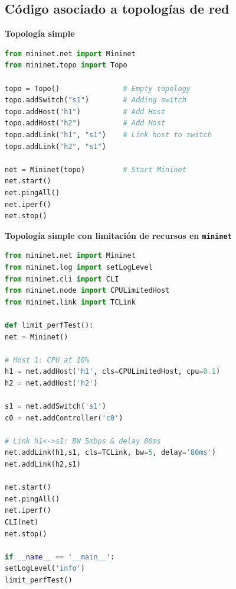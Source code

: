 \documentclass[12pt]{article}
\begin{document}
	\pagebreak
	
	\subsection{Código asociado a topologías de red}
	\label{sec: anexo 4}
	
	\vspace{10px}
	\noindent \textbf{\large Topología simple}\\
	
	\begin{lstlisting}[language=Python, caption={Implementación topología simple utilizando \texttt{mininet} (\texttt{basic.py})}, label={lst: topo simple}]
from mininet.net import Mininet
from mininet.topo import Topo

topo = Topo()				# Empty topology
topo.addSwitch("s1")		# Adding switch
topo.addHost("h1")			# Add Host
topo.addHost("h2")			# Add Host
topo.addLink("h1", "s1")	# Link host to switch
topo.addLink("h2", "s1")

net = Mininet(topo)			# Start Mininet
net.start()
net.pingAll()
net.iperf()
net.stop()
	\end{lstlisting}

	\vspace{20px}
	\noindent \textbf{\large Topología simple con limitación de recursos en \texttt{mininet}}\\
	\begin{lstlisting}[language=Python, caption={Código topología simple con limitación de recursos en \texttt{mininet} (\texttt{limit.py})}, label={lst: topo simple cpu mn}]
from mininet.net import Mininet
from mininet.log import setLogLevel
from mininet.cli import CLI
from mininet.node import CPULimitedHost
from mininet.link import TCLink

def limit_perfTest():
net = Mininet()

# Host 1: CPU at 10%
h1 = net.addHost('h1', cls=CPULimitedHost, cpu=0.1)		
h2 = net.addHost('h2')

s1 = net.addSwitch('s1')
c0 = net.addController('c0')

# Link h1<->s1: BW 5mbps & delay 80ms
net.addLink(h1,s1, cls=TCLink, bw=5, delay='80ms')
net.addLink(h2,s1)

net.start()
net.pingAll()
net.iperf()
CLI(net)
net.stop()

if __name__ == '__main__':
setLogLevel('info')
limit_perfTest()
	\end{lstlisting}
\end{document}
